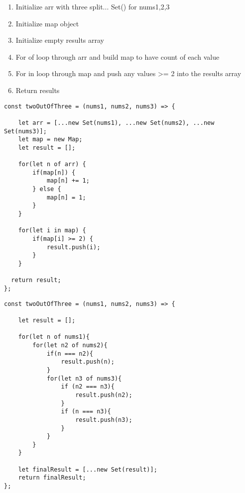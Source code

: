 \documentclass[10pt]{article}
\begin{document}
\begin{enumerate}
	\item Initialize arr with three split... Set() for nums1,2,3
	\item Initialize map object
	\item Initialize empty results array
	\item For of loop through arr and build map to have count of each value
	\item For in loop through map and push any values >= 2 into the results array
	\item Return results
\end{enumerate}

\begin{lstlisting}[title=Solution twoOutOfThree O(n) time/space, captionpos=t]
const twoOutOfThree = (nums1, nums2, nums3) => {
    
    let arr = [...new Set(nums1), ...new Set(nums2), ...new Set(nums3)];
    let map = new Map;
    let result = [];
    
    for(let n of arr) {
        if(map[n]) {
            map[n] += 1;
        } else {
            map[n] = 1;
        }
    }
    
    for(let i in map) {
        if(map[i] >= 2) {
            result.push(i);
        }
    }
    
  return result;
};
\end{lstlisting}


\begin{lstlisting}[title=Solution twoOutOfThree - clunky first answer, captionpos=t]
const twoOutOfThree = (nums1, nums2, nums3) => {
    
    let result = [];
    
    for(let n of nums1){
        for(let n2 of nums2){
            if(n === n2){
                result.push(n);
            }
            for(let n3 of nums3){
                if (n2 === n3){
                    result.push(n2);
                }
                if (n === n3){
                    result.push(n3);
                }
            }
        }
    }
    
    let finalResult = [...new Set(result)];
    return finalResult;
};
\end{lstlisting}
\medskip %








\pagebreak %
\medskip   
\end{document}
